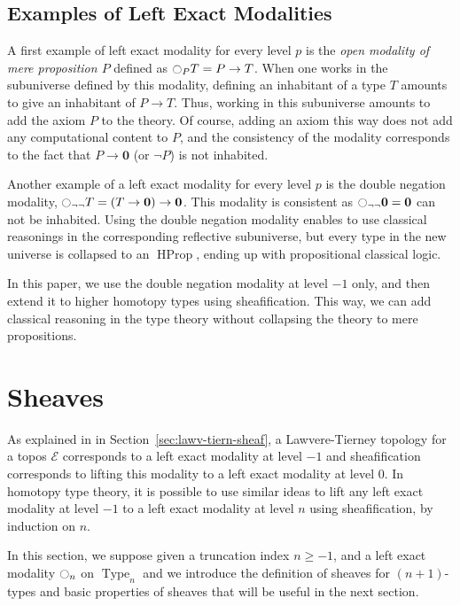 \documentclass[conference]{IEEEtran}
\DeclareMathOperator{\Type}{Type}
\DeclareMathOperator{\HProp}{HProp}
\newcommand{\modal}{\ensuremath{\ocircle}}
\newcommand \E {\mathcal{E}}
\newcommand \zero {\mathbf{0}}
\begin{document}
\subsection{Examples of Left Exact Modalities}
\label{sec:examples-left-exact}

A first example of left exact modality for every level $p$ is the {\em
  open modality of mere proposition $P$} defined as
$\modal_P T = P \to T$.
%
When one works in
the subuniverse defined by this modality, defining an inhabitant of a
type $T$ amounts to give an inhabitant of $P \to T$. 
%
Thus, working in this subuniverse amounts to add the axiom $P$ to the
theory. Of course, adding an axiom this way does not add any computational
content to $P$, and the consistency of the modality corresponds to
the fact that $P \to \zero$ (or $\lnot P$) is not inhabited.

Another example of a left exact modality for every level $p$ is the
double negation modality,
$\modal_{\lnot\lnot} T = (T \to \zero) \to \zero$.
%
This modality is consistent as $\modal_{\lnot\lnot} \zero = \zero$ can
not be inhabited.
%
Using the double negation modality enables to use classical reasonings
in the corresponding reflective subuniverse, but every type in the new
universe is collapsed to an $\HProp$, ending up with propositional
classical logic.

In this paper, we use the double negation modality at level $-1$ only,
and then extend it to higher homotopy types using sheafification. This
way, we can add classical reasoning in the type theory without
collapsing the theory to mere propositions.




\section{Sheaves}
\label{sec:sheaves}

As explained in in Section~\ref{sec:lawv-tiern-sheaf}, a
Lawvere-Tierney topology for a topos $\E$ corresponds to a left exact
modality at level $-1$
%
and sheafification corresponds to lifting this modality to a left
exact modality at level $0$.
%
In homotopy type theory, it is possible to use similar ideas to lift
any left exact modality at level $-1$ to a left exact modality at level
$n$ using sheafification, by induction on $n$.

In this section, we suppose given a truncation index $n\geqslant -1$,
and a left exact modality $\modal_n$ on $\Type_n$ and we introduce the
definition of sheaves for $(n+1)$-types and basic properties of
sheaves that will be useful in the next section. 
\end{document}
